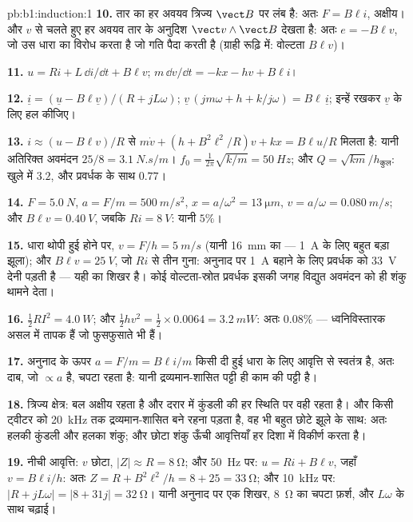 \begin{solution}{pb:b1:induction:1}
\textbf{10.} तार का हर अवयव त्रिज्य $\vect B$ पर लंब है:
अतः $F = B\ell i$, अक्षीय। और $v$ से चलते हुए हर अवयव तार के अनुदिश
$\vect v\wedge\vect B$ देखता है: अतः $e = -B\ell v$, जो उस धारा का विरोध करता
है जो गति पैदा करती है (ग्राही रूढ़ि में: वोल्टता $B\ell v$)।

\textbf{11.} $u = Ri + L\,\dd i/\dd t + B\ell v$; $m\,\dd v/\dd t = -kx - hv + B\ell i$।

\textbf{12.} $\underline i = (\underline u - B\ell\underline v)/(R + jL\omega)$; $\underline v\,(jm\omega + h +
k/j\omega) = B\ell\,\underline i$; इन्हें रखकर $\underline v$ के लिए हल कीजिए।

\textbf{13.} $i \approx (u - B\ell v)/R$ से $m\dot v + (h + B^2\ell^2/R)v + kx =
B\ell u/R$ मिलता है: यानी अतिरिक्त अवमंदन $25/8 = \qty{3.1}{N.s/m}$। $f_0 = \tfrac1{2\pi}\sqrt{k/m} =
\qty{50}{Hz}$; और $Q = \sqrt{km}/h_{\text{कुल}}$: खुले में $3.2$, और प्रवर्धक के
साथ $0.77$।

\textbf{14.} $F = \qty{5.0}{N}$, $a = F/m = \qty{500}{m/s^2}$, $x = a/\omega^2 =
\qty{13}{\micro m}$, $v = a/\omega = \qty{0.080}{m/s}$; और $B\ell v = \qty{0.40}{V}$, जबकि
$Ri = \qty{8}{V}$: यानी $5\%$।

\textbf{15.} धारा थोपी हुई होने पर, $v = F/h = \qty{5}{m/s}$ (यानी
\qty{16}{mm} का  --- \qty{1}{A} के लिए बहुत बड़ा झूला); और $B\ell v =
\qty{25}{V}$, जो $Ri$ से तीन गुना: अनुनाद पर \qty{1}{A} बहाने के लिए प्रवर्धक
को \qty{33}{V} देनी पड़ती है --- यही  का शिखर है। कोई वोल्टता-स्रोत
प्रवर्धक इसकी जगह विद्युत अवमंदन को ही शंकु थामने देता।

\textbf{16.} $\tfrac12RI^2 = \qty{4.0}{W}$; और $\tfrac12hv^2 = \tfrac12 \times 0.0064 =
\qty{3.2}{mW}$: अतः  $0.08\%$ --- ध्वनिविस्तारक असल में तापक हैं जो
फुसफुसाते भी हैं।

\textbf{17.} अनुनाद के ऊपर $a = F/m = B\ell i/m$ किसी दी हुई धारा के लिए
आवृत्ति से स्वतंत्र है, अतः दाब, जो $\propto a$ है, चपटा रहता है:
यानी द्रव्यमान-शासित पट्टी ही काम की पट्टी है।

\textbf{18.} त्रिज्य क्षेत्र: बल अक्षीय रहता है और दरार में कुंडली की हर
स्थिति पर वही रहता है। और किसी ट्वीटर को \qty{20}{kHz} तक द्रव्यमान-शासित
बने रहना पड़ता है, वह भी बहुत छोटे झूले के साथ: अतः हलकी कुंडली और हलका
शंकु; और छोटा शंकु ऊँची आवृत्तियाँ हर दिशा में विकीर्ण करता है।

\textbf{19.} नीची आवृत्ति: $v$ छोटा, $|Z| \approx R = \qty{8}{\ohm}$; और
\qty{50}{Hz} पर: $u = Ri + B\ell v$, जहाँ $v = B\ell i/h$: अतः $Z = R + B^2\ell^2/h = 8 + 25 =
\qty{33}{\ohm}$; और \qty{10}{kHz} पर: $|R + jL\omega| = |8 + 31j| = \qty{32}{\ohm}$।
यानी अनुनाद पर एक शिखर, \qty{8}{\ohm} का चपटा फ़र्श, और $L\omega$ के साथ चढ़ाई।


\end{solution}
